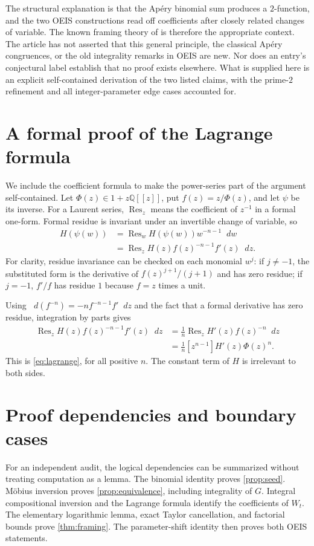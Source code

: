 \documentclass[11pt,letterpaper]{article}
\numberwithin{equation}{section}
\theoremstyle{definition}
\theoremstyle{remark}
\newcommand{\Q}{\mathbb Q}
\newcommand{\dd}{\mathop{}\!d}
\begin{document}
The structural explanation is that the Ap\'ery binomial sum produces a
$2$-function, and the two OEIS constructions read off coefficients after
closely related changes of variable. The known framing theory of
\cite{svw2013,svw2017} is therefore the appropriate context. The article
has not asserted that this general principle, the classical Ap\'ery
congruences, or the old integrality remarks in OEIS are new. Nor does
an entry's conjectural label establish that no proof exists elsewhere.
What is supplied here is an explicit self-contained derivation of the
two listed claims, with the prime-$2$ refinement and all integer-parameter
edge cases accounted for.

\appendix
\section{A formal proof of the Lagrange formula}\label{app:lagrange}
We include the coefficient formula to make the power-series part of the
argument self-contained. Let $\Phi(z)\in1+z\Q[[z]]$, put
$f(z)=z/\Phi(z)$, and let $\psi$ be its inverse. For a Laurent series,
$\operatorname{Res}_z$ means the coefficient of $z^{-1}$ in a formal
one-form. Formal residue is invariant under an invertible change of
variable, so
\begin{align*}
 [w^n]H(\psi(w))
 &=\operatorname{Res}_w H(\psi(w))w^{-n-1}\dd w\\
 &=\operatorname{Res}_z H(z)f(z)^{-n-1}f'(z)\dd z.
\end{align*}
For clarity, residue invariance can be checked on each monomial $w^j$:
if $j\ne-1$, the substituted form is the derivative of
$f(z)^{j+1}/(j+1)$ and has zero residue; if $j=-1$, $f'/f$ has residue $1$
because $f=z$ times a unit.

Using $\dd(f^{-n})=-n f^{-n-1}f'\dd z$ and the fact that a formal derivative
has zero residue, integration by parts gives
\begin{align*}
 \operatorname{Res}_z H(z)f(z)^{-n-1}f'(z)\dd z
 &=\frac1n\operatorname{Res}_z H'(z)f(z)^{-n}\dd z\\
 &=\frac1n[z^{n-1}]H'(z)\Phi(z)^n.
\end{align*}
This is \eqref{eq:lagrange}, for all positive $n$. The constant term of
$H$ is irrelevant to both sides.

\section{Proof dependencies and boundary cases}\label{app:audit}
For an independent audit, the logical dependencies can be summarized
without treating computation as a lemma. The binomial identity proves
\cref{prop:seed}. M\"obius inversion proves \cref{prop:equivalence}, including
integrality of $G$. Integral compositional inversion and the Lagrange
formula identify the coefficients of $W_t$. The elementary logarithmic
lemma, exact Taylor cancellation, and factorial bounds prove
\cref{thm:framing}. The parameter-shift identity then proves both OEIS
statements.
\end{document}

